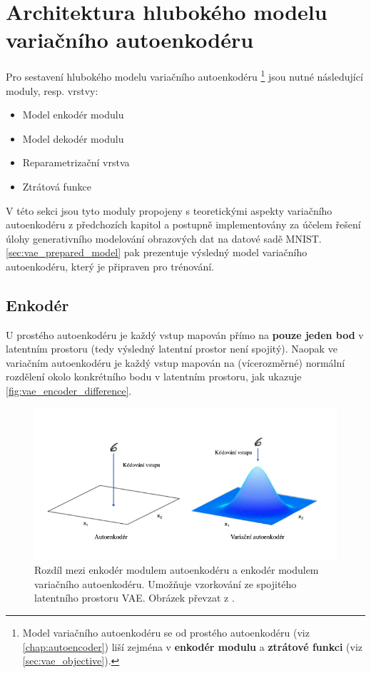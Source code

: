 \section{Architektura hlubokého modelu variačního autoenkodéru}
Pro sestavení hlubokého modelu variačního autoenkodéru
\footnote{Model variačního autoenkodéru se od prostého autoenkodéru (viz \autoref{chap:autoencoder}) liší zejména v \textbf{enkodér modulu} a \textbf{ztrátové funkci} (viz \autoref{sec:vae_objective}).} jsou nutné následující moduly, resp. vrstvy:
\begin{itemize}
    \item Model enkodér modulu
    \item Model dekodér modulu
    \item Reparametrizační vrstva
    \item Ztrátová funkce
\end{itemize}

V této sekci jsou tyto moduly propojeny s teoretickými aspekty variačního autoenkodéru z předchozích kapitol a postupně implementovány za účelem řešení úlohy generativního modelování obrazových dat na datové sadě MNIST.
\autoref{sec:vae_prepared_model} pak prezentuje výsledný model variačního autoenkodéru, který je připraven pro trénování.

\subsection{Enkodér}
\label{sec:vae_model_encoder}
U prostého autoenkodéru je každý vstup mapován přímo na \textbf{pouze jeden bod} v latentním prostoru (tedy výsledný latentní prostor není spojitý).
Naopak ve variačním autoenkodéru je každý vstup mapován na (vícerozměrné) normální rozdělení okolo konkrétního bodu v latentním prostoru, jak ukazuje \autoref{fig:vae_encoder_difference}.

\begin{figure}[H]
    \centering
    \includegraphics[width=\textwidth]{figures/vae_encoder_module.png}
    \caption{Rozdíl mezi enkodér modulem autoenkodéru a enkodér modulem variačního autoenkodéru. Umožňuje vzorkování ze spojitého latentního prostoru VAE. Obrázek převzat z \textcite{Foster2023}.}
    \label{fig:vae_encoder_difference}
\end{figure}

